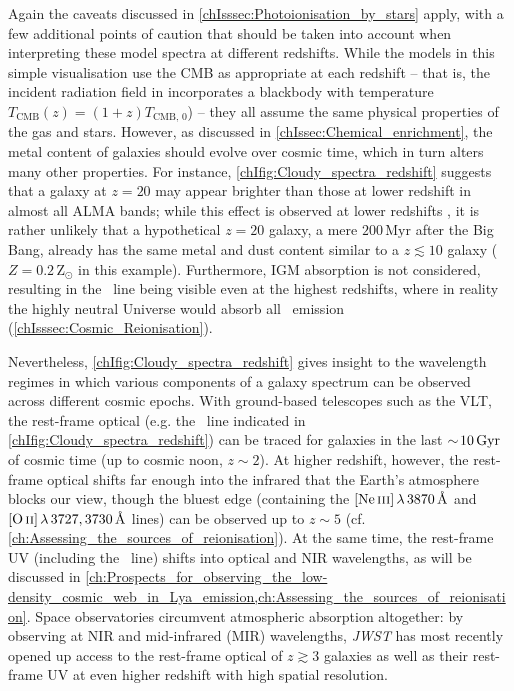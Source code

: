 Again the caveats discussed in \cref{chIsssec:Photoionisation_by_stars} apply, with a few additional points of caution that should be taken into account when interpreting these model spectra at different redshifts. While the models in this simple visualisation use the CMB as appropriate at each redshift -- that is, the incident radiation field in  incorporates a blackbody with temperature $T_\text{CMB} (z) = (1+z) T_{\text{CMB}, \, 0}$) -- they all assume the same physical properties of the gas and stars. However, as discussed in \cref{chIssec:Chemical_enrichment}, the metal content of galaxies should evolve over cosmic time, which in turn alters many other properties. For instance, \cref{chIfig:Cloudy_spectra_redshift} suggests that a galaxy at $z = 20$ may appear brighter than those at lower redshift in almost all ALMA bands; while this effect is observed at lower redshifts \citep[the ``negative-$K$ correction'';][]{2014PhR...541...45C}, it is rather unlikely that a hypothetical $z = 20$ galaxy, a mere $200 \, \mathrm{Myr}$ after the Big Bang, already has the same metal and dust content similar to a $z \lesssim 10$ galaxy ($Z = 0.2 \, \mathrm{Z_\odot}$ in this example). Furthermore, IGM absorption is not considered, resulting in the \lya\ line being visible even at the highest redshifts, where in reality the highly neutral Universe would absorb all \lya\ emission (\cref{chIsssec:Cosmic_Reionisation}).

Nevertheless, \cref{chIfig:Cloudy_spectra_redshift} gives insight to the wavelength regimes in which various components of a galaxy spectrum can be observed across different cosmic epochs. With ground-based telescopes such as the VLT, the rest-frame optical (e.g. the \Halpha\ line indicated in \cref{chIfig:Cloudy_spectra_redshift}) can be traced for galaxies in the last $\sim \! 10 \, \mathrm{Gyr}$ of cosmic time (up to cosmic noon, $z \sim 2$). At higher redshift, however, the rest-frame optical shifts far enough into the infrared that the Earth's atmosphere blocks our view, though the bluest edge (containing the $\NeIII \, \lambda \, 3870 \, \Angstrom$ and $\OII \, \lambda \, 3727, 3730 \, \Angstrom$ lines) can be observed up to $z \sim 5$ (cf. \cref{ch:Assessing_the_sources_of_reionisation}). At the same time, the rest-frame UV (including the \lya\ line) shifts into optical and NIR wavelengths, as will be discussed in \cref{ch:Prospects_for_observing_the_low-density_cosmic_web_in_Lya_emission,ch:Assessing_the_sources_of_reionisation}. Space observatories circumvent atmospheric absorption altogether: by observing at NIR and mid-infrared (MIR) wavelengths, \textit{JWST} has most recently opened up access to the rest-frame optical of $z \gtrsim 3$ galaxies as well as their rest-frame UV at even higher redshift with high spatial resolution.

